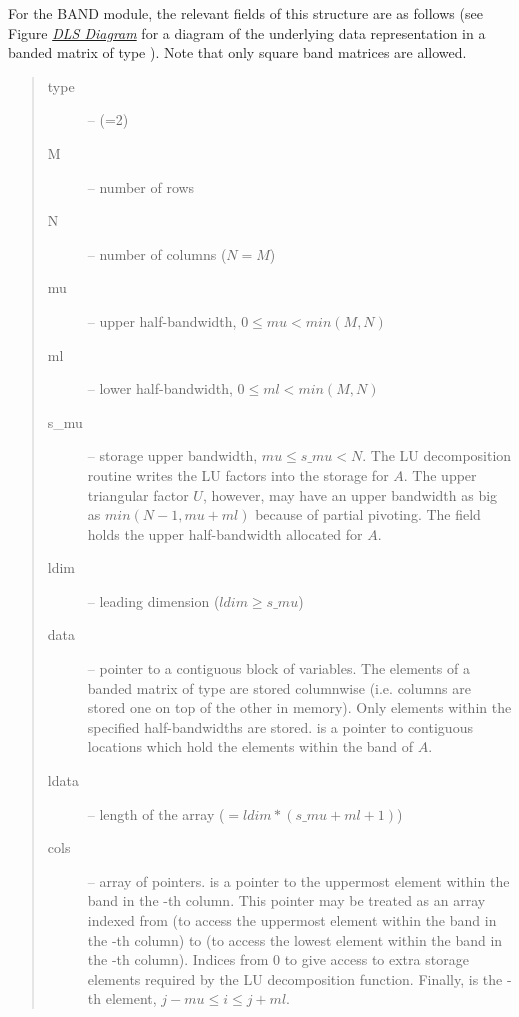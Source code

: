 \documentclass[letterpaper,10pt,english]{sphinxmanual}
\begin{document}
For the BAND module, the relevant fields of this structure are as
follows (see Figure {\hyperref[linear_solvers/DLS:dls-figure]{\emph{DLS Diagram}}} for a diagram of
the underlying data representation in a banded matrix of type
{\hyperref[linear_solvers/DLS:DlsMat]{}}). Note that only square band matrices are allowed.
\begin{quote}\begin{description}
\item[{type}] \leavevmode
--  (=2)

\item[{M}] \leavevmode
-- number of rows

\item[{N}] \leavevmode
-- number of columns ($N = M$)

\item[{mu}] \leavevmode
-- upper half-bandwidth, $0 \le mu < min(M,N)$

\item[{ml}] \leavevmode
-- lower half-bandwidth, $0 \le ml < min(M,N)$

\item[{s\_mu}] \leavevmode
-- storage upper bandwidth, $mu \le s\_mu < N$. The LU
decomposition routine writes the LU factors into the storage for
$A$. The upper triangular factor $U$, however, may
have an upper bandwidth as big as $min(N-1,mu+ml)$ because
of partial pivoting. The  field holds the upper
half-bandwidth allocated for $A$.

\item[{ldim}] \leavevmode
-- leading dimension ($ldim \ge s\_mu$)

\item[{data}] \leavevmode
-- pointer to a contiguous block of 
variables. The elements of a banded matrix of type
{\hyperref[linear_solvers/DLS:DlsMat]{}} are stored columnwise (i.e. columns are stored
one on top of the other in memory). Only elements within the
specified half-bandwidths are stored.  is a pointer to
 contiguous locations which hold the elements within the
band of $A$.

\item[{ldata}] \leavevmode
-- length of the  array ($= ldim*(s\_mu+ml+1)$)

\item[{cols}] \leavevmode
-- array of pointers.  is a pointer to the
uppermost element within the band in the -th column. This
pointer may be treated as an array indexed from  (to
access the uppermost element within the band in the -th
column) to  (to access the lowest element within the
band in the -th column). Indices from 0 to  give
access to extra storage elements required by the LU decomposition
function. Finally,  is the -th
element, $j-mu \le i \le j+ml$.

\end{description}\end{quote}
\end{document}
